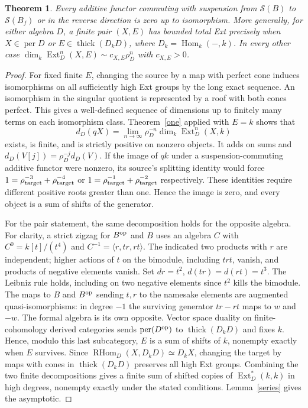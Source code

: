 \documentclass[11pt]{article}
\newtheorem{thm}{Theorem}
\newcommand{\per}{\operatorname{per}}
\newcommand{\thick}{\operatorname{thick}}
\newcommand{\Ext}{\operatorname{Ext}}
\newcommand{\Hom}{\operatorname{Hom}}
\newcommand{\sg}{\mathcal S}
\begin{document}
\begin{thm}\label{growth}
Every additive functor commuting with suspension from $\sg(B)$ to
$\sg(B_f)$ or in the reverse direction is zero up to isomorphism.
More generally, for either algebra $D$, a finite pair $(X,E)$ has
bounded total Ext precisely when $X\in\per D$ or
$E\in\thick(D_kD)$, where $D_k=\Hom_k(-,k)$. In every other case
$\dim_k\Ext_D^n(X,E)\sim c_{X,E}\rho_D^n$ with $c_{X,E}>0$.
\end{thm}
\begin{proof}
For fixed finite $E$, changing the source by a map with perfect cone
induces isomorphisms on all sufficiently high Ext groups by the long
exact sequence. An isomorphism in the singular quotient is represented
by a roof with both cones perfect. This gives a well-defined sequence
of dimensions up to finitely many terms on each isomorphism class.
Theorem~\ref{one} applied with $E=k$ shows that
\[
 d_D(qX)=\lim_{n\to\infty}\rho_D^{-n}\dim_k\Ext_D^n(X,k)
\]
exists, is finite, and is strictly positive on nonzero objects. It adds
on sums and $d_D(V[j])=\rho_D^{-j}d_D(V)$. If the image of $qk$ under
a suspension-commuting additive functor were nonzero, its source's
splitting identity would force $1=\rho_{\rm target}^{-3}+
\rho_{\rm target}^{-4}$ or $1=\rho_{\rm target}^{-1}+
\rho_{\rm target}^{-2}$ respectively. These identities require different
positive roots greater than one. Hence the image is zero, and every
object is a sum of shifts of the generator.

For the pair statement, the same decomposition holds for the opposite
algebra. For clarity, a strict zigzag for $B^{\rm op}$ and $B$ uses an
algebra $C$ with $C^0=k[t]/(t^4)$ and $C^{-1}=\langle r,tr,rt\rangle$.
The indicated two products with $r$ are independent; higher actions of
$t$ on the bimodule, including $trt$, vanish, and products of negative
elements vanish. Set $dr=t^2$, $d(tr)=d(rt)=t^3$. The Leibniz rule
holds, including on two negative elements since $t^2$ kills the bimodule.
The maps to $B$ and $B^{\rm op}$ sending $t,r$ to the namesake elements
are augmented quasi-isomorphisms: in degree $-1$ the surviving generator
$tr-rt$ maps to $w$ and $-w$. The formal algebra is its own opposite.
Vector space duality on finite-cohomology derived categories sends
$\per(D^{\rm op})$ to $\thick(D_kD)$ and fixes $k$. Hence, modulo this
last subcategory, $E$ is a sum of shifts of $k$, nonempty exactly when
$E$ survives. Since $\operatorname{RHom}_D(X,D_kD)\simeq D_kX$, changing
the target by maps with cones in $\thick(D_kD)$ preserves all high Ext
groups. Combining the two finite decompositions gives a finite sum
of shifted copies of $\Ext_D^*(k,k)$ in high degrees, nonempty exactly
under the stated conditions. Lemma~\ref{series} gives the asymptotic.
\end{proof}
\end{document}
